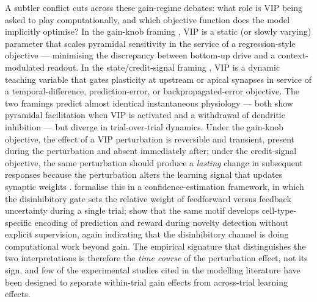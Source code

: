 \documentclass[11pt]{article}
\begin{document}
A subtler conflict cuts across these gain-regime debates: what role is VIP being asked to play computationally, and which objective function does the model implicitly optimise? In the gain-knob framing \citep{Garciadelmolino2017, Hertag2019, Veit2023}, VIP is a static (or slowly varying) parameter that scales pyramidal sensitivity in the service of a regression-style objective --- minimising the discrepancy between bottom-up drive and a context-modulated readout. In the state/credit-signal framing \citep{Hertag2020, Hertag2021, Lee2025, Wilmes2019, Chevy2024}, VIP is a dynamic teaching variable that gates plasticity at upstream or apical synapses in service of a temporal-difference, prediction-error, or backpropagated-error objective. The two framings predict almost identical instantaneous physiology --- both show pyramidal facilitation when VIP is activated and a withdrawal of dendritic inhibition --- but diverge in trial-over-trial dynamics. Under the gain-knob objective, the effect of a VIP perturbation is reversible and transient, present during the perturbation and absent immediately after; under the credit-signal objective, the same perturbation should produce a \textit{lasting} change in subsequent responses because the perturbation alters the learning signal that updates synaptic weights \citep{Lee2025, Hertag2020, Hertag2021, Chevy2024}. \citet{Hertag2023} formalise this in a confidence-estimation framework, in which the disinhibitory gate sets the relative weight of feedforward versus feedback uncertainty during a single trial; \citet{Sharafeldin2025} show that the same motif develops cell-type-specific encoding of prediction and reward during novelty detection without explicit supervision, again indicating that the disinhibitory channel is doing computational work beyond gain. The empirical signature that distinguishes the two interpretations is therefore the \textit{time course} of the perturbation effect, not its sign, and few of the experimental studies cited in the modelling literature \citep{Pi2013, Fu2014, Lee2013, Krabbe2019, Myersjoseph2024, Dipoppa2018} have been designed to separate within-trial gain effects from across-trial learning effects.
\end{document}
